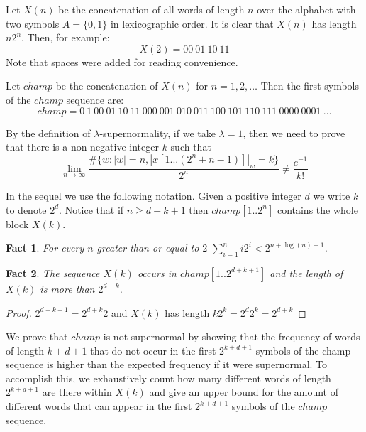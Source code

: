 \documentclass[11pt,a4paper]{tesis}
\newtheorem{fact}{Fact}[]
\begin{document}
Let $X(n)$ be the concatenation of all words of length $n$ over the alphabet with two symbols $A=\{0,1\}$ in lexicographic order.  It is clear that $X(n)$ has length $n2^n$. Then, for example:
$$X(2) = 00 \: 01 \: 10 \: 11$$
Note that spaces were added for reading convenience.

Let $champ$
 be the concatenation of $X(n)$ for $n = 1,2,\dots$
 Then the first symbols of the $champ$
sequence are:
$$champ = 0 \: 1 \: 00 \: 01 \: 10 \: 11 \: 000 \: 001 \: 010 \: 011 \: 100 \: 101 \: 110 \: 111 \: 0000 \: 0001 \: \dots$$

By the definition of $\lambda$-supernormality, if we take $\lambda = 1$, then we need to prove that there is a non-negative integer $k$ such that
$$\lim_{n\to\infty} \frac{\#\{w: |w| = n  , |x[1...(2^n+n-1)]|_w = k\}}{2^n} \neq \frac{e^{-1}}{k!}$$

\bigskip

In the sequel we use the following notation. Given  a positive integer $d$ we write $k$ to denote $2^d$.
Notice that if  $n \geq d + k + 1$ then $champ[1.. 2^n]$ contains the whole block $X(k)$.%


\begin{fact}
For every $n$ greater than or equal to $2$  $\sum_{i=1}^n i2^i < 2^{n + \log(n) + 1}$.
\end{fact}

\begin{fact} \label{p2}
The sequence $X(k)$ occurs in $champ[1.. 2^{d+k+1}]$ and  the length of $X(k)$ is more than $2^{d+k}$.
\end{fact}
\begin{proof}
  $2^{d+k+1} = 2^{d+k}2$ and $X(k)$ has length $k2^k = 2^d2^k = 2^{d+k}$ 
\end{proof}

We prove that $champ$ is not supernormal by showing that the frequency of words
 of length $k+d+1$ that do not occur in the first $2^{k+d+1}$ symbols of the champ
 sequence is higher than the expected frequency if it were supernormal.
To accomplish this, we exhaustively count how many different words of length $2^{k+d+1}$ 
are there within $X(k)$ and give an upper bound for the amount of different words that can 
appear in the first $2^{k+d+1}$ symbols of the $champ$ sequence.
\end{document}
